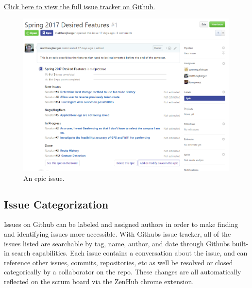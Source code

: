 \documentclass{scrreprt}
\begin{document}
\href{https://github.com/matthewjberger/navatar/issues}{Click here to view the full issue tracker on Github.}

\begin{center}
\begin{figure}[ht!]
\includegraphics[width=\textwidth,height=\textheight,keepaspectratio]{epic.png}
\caption{An epic issue.}
\end{figure}
\end{center}

\pagebreak

\subsection{Issue Categorization}

Issues on Github can be labeled and assigned authors in order to make finding and identifying issues more accessible. With Github\textsc{}s issue tracker, all of the issues listed are searchable by tag, name, author, and date through Github\textsc{}s built-in search capabilities. Each issue contains a conversation about the issue, and can reference other issues, commits, repositories, etc as well be resolved or closed categorically by a collaborator on the repo. These changes are all automatically reflected on the scrum board via the ZenHub chrome extension.
\end{document}
